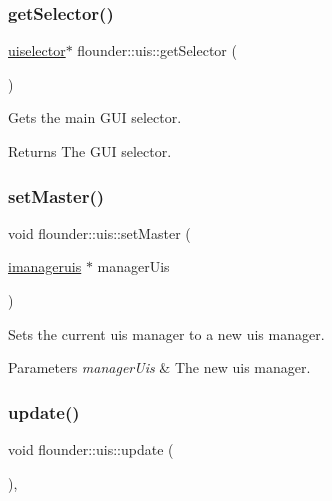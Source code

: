 \subsubsection{\texorpdfstring{get\+Selector()}{getSelector()}}
{\footnotesize\ttfamily \hyperlink{classflounder_1_1uiselector}{uiselector}$\ast$ flounder\+::uis\+::get\+Selector (\begin{DoxyParamCaption}{ }\end{DoxyParamCaption})\hspace{0.3cm}{\ttfamily [inline]}}



Gets the main G\+UI selector. 

\begin{DoxyReturn}{Returns}
The G\+UI selector. 
\end{DoxyReturn}
\mbox{\label{classflounder_1_1uis_a7c9d9da159b38dd8e4476b75af71b33b}} 
\subsubsection{\texorpdfstring{set\+Master()}{setMaster()}}
{\footnotesize\ttfamily void flounder\+::uis\+::set\+Master (\begin{DoxyParamCaption}\item[{\hyperlink{classflounder_1_1imanageruis}{imanageruis} $\ast$}]{manager\+Uis }\end{DoxyParamCaption})\hspace{0.3cm}{\ttfamily [inline]}}



Sets the current uis manager to a new uis manager. 


\begin{DoxyParams}{Parameters}
{\em manager\+Uis} & The new uis manager. \\
\hline
\end{DoxyParams}
\mbox{\label{classflounder_1_1uis_a234b52f70d1819932752a03168f21e10}} 
\subsubsection{\texorpdfstring{update()}{update()}}
{\footnotesize\ttfamily void flounder\+::uis\+::update (\begin{DoxyParamCaption}{ }\end{DoxyParamCaption})\hspace{0.3cm}{\ttfamily [override]}, {\ttfamily [virtual]}}



